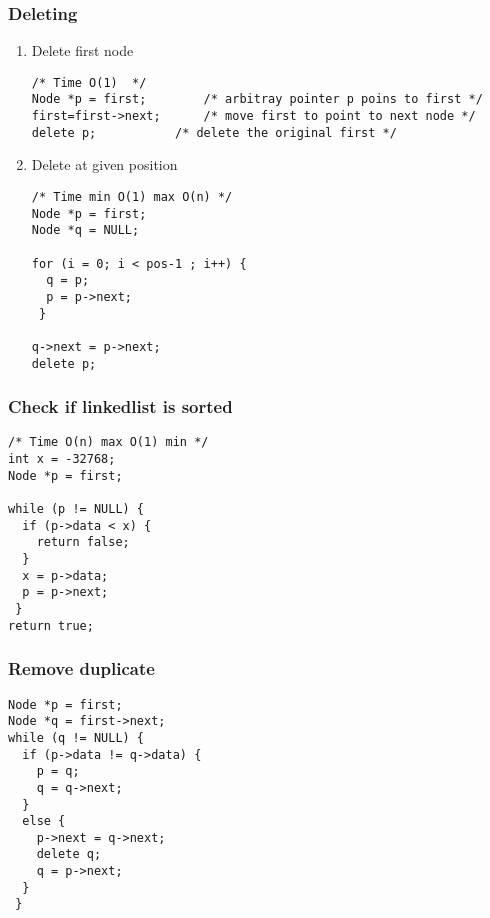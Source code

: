 \documentclass[11pt]{article}
\begin{document}
\subsubsection{Deleting}
\label{sec:org2acb104}
\begin{enumerate}
\item Delete first node
\label{sec:org915a5e4}
\begin{verbatim}
/* Time O(1)  */
Node *p = first;		/* arbitray pointer p poins to first */
first=first->next;		/* move first to point to next node */
delete p; 			/* delete the original first */

\end{verbatim}
\item Delete at given position
\label{sec:org07c3121}
\begin{verbatim}
/* Time min O(1) max O(n) */
Node *p = first;
Node *q = NULL;

for (i = 0; i < pos-1 ; i++) {
  q = p;
  p = p->next;
 }

q->next = p->next;
delete p;

\end{verbatim}
\end{enumerate}
\subsubsection{Check if linkedlist is sorted}
\label{sec:orgc144797}
\begin{verbatim}
/* Time O(n) max O(1) min */
int x = -32768;
Node *p = first;

while (p != NULL) {
  if (p->data < x) {
    return false;
  }
  x = p->data;
  p = p->next;
 }
return true;
\end{verbatim}
\subsubsection{Remove duplicate}
\label{sec:org34ee537}
\begin{verbatim}
Node *p = first;
Node *q = first->next;
while (q != NULL) {
  if (p->data != q->data) {
    p = q;
    q = q->next;
  }
  else {
    p->next = q->next;
    delete q;
    q = p->next;
  }
 }
\end{verbatim}
\end{document}
